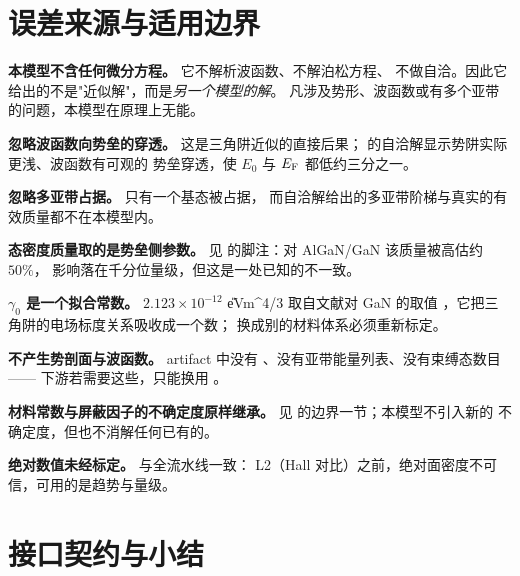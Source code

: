 \section{误差来源与适用边界}
\label{sec:tw-limits}

\limitsheading

\begin{bounds}
  \item \textbf{本模型不含任何微分方程。} 它不解析波函数、不解泊松方程、
        不做自洽。因此它给出的不是"近似解"，而是\emph{另一个模型的解}。
        凡涉及势形、波函数或有多个亚带的问题，本模型在原理上无能。

  \item \textbf{忽略波函数向势垒的穿透。} 这是三角阱近似的直接后果；
         的自洽解显示势阱实际更浅、波函数有可观的
        势垒穿透，使 $E_0$ 与 $E_{\mathrm{F}}$ 都低约三分之一。

  \item \textbf{忽略多亚带占据。} 只有一个基态被占据，
        而自洽解给出的多亚带阶梯与真实的有效质量都不在本模型内。

  \item \textbf{态密度质量取的是势垒侧参数。} 见 
        的脚注：对 AlGaN/GaN 该质量被高估约 $50\%$，
        影响落在千分位量级，但这是一处已知的不一致。

  \item \textbf{$\gamma_0$ 是一个拟合常数。} $2.123\times10^{-12}$
        \U{eV\cdot m^{4/3}} 取自文献对 GaN 的取值
        \cite{ambacher2000}，它把三角阱的电场标度关系吸收成一个数；
        换成别的材料体系必须重新标定。

  \item \textbf{不产生势剖面与波函数。} artifact 中没有
        、没有亚带能量列表、没有束缚态数目 ——
        下游若需要这些，只能换用 。

  \item \textbf{材料常数与屏蔽因子的不确定度原样继承。} 见
         的边界一节；本模型不引入新的
        不确定度，但也不消解任何已有的。

  \item \textbf{绝对数值未经标定。} 与全流水线一致：
        L2（Hall 对比）之前，绝对面密度不可信，可用的是趋势与量级。
\end{bounds}

\section{接口契约与小结}
\label{sec:tw-interface}

